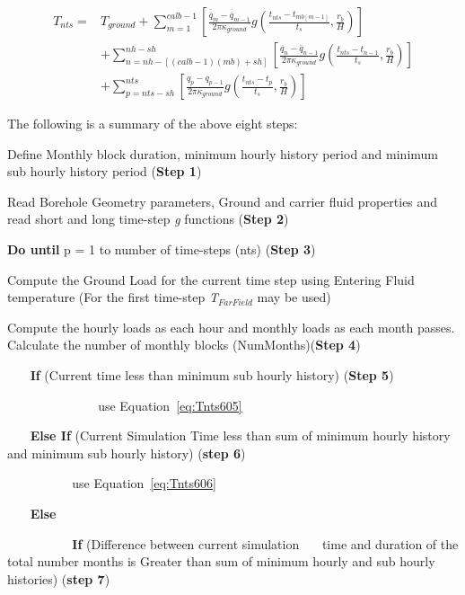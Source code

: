 \begin{equation}
\begin{array}{rl}
{T_{nts}} =& {T_{ground}} + \sum\limits_{m = 1}^{calb - 1} {\left[ {\frac{{{{\overline{\overline q} }_m} - {{\overline{\overline q} }_{m - 1}}}}{{2\pi {\kappa_{ground}}}}g\left( {\frac{{{t_{nts}} - {t_{mb[m - 1]}}}}{{{t_s}}},\frac{{{r_b}}}{H}} \right)} \right]} \\
 & + \sum\limits_{n = nh - [(calb - 1)(mb) + sh]}^{nh - sh} {\left[ {\frac{{{{\overline q }_n} - {{\overline q }_{n - 1}}}}{{2\pi {\kappa_{ground}}}}g\left( {\frac{{{t_{nts}} - {t_{n - 1}}}}{{{t_s}}},\frac{{{r_b}}}{H}} \right)} \right]} \\
 & + \sum\limits_{p = nts - sh}^{nts} {\left[ {\frac{{{q_p} - {q_{p - 1}}}}{{2\pi {\kappa_{ground}}}}g\left( {\frac{{{t_{nts}} - {t_p}}}{{{t_s}}},\frac{{{r_b}}}{H}} \right)} \right]}
\end{array}
\label{eq:Tnts608}
\end{equation}

The following is a summary of the above eight steps:

Define Monthly block duration, minimum hourly history period and minimum sub hourly history period (\textbf{Step 1})

Read Borehole Geometry parameters, Ground and carrier fluid properties and read short and long time-step \emph{g} functions (\textbf{Step 2})

\textbf{Do until} p = 1 to number of time-steps (nts) (\textbf{Step 3})

Compute the Ground Load for the current time step using Entering Fluid temperature (For the first time-step \emph{T}\(_{FarField}\) may be used)

Compute the hourly loads as each hour and monthly loads as each month passes. Calculate the number of monthly blocks (NumMonths)(\textbf{Step 4})

~~~ \textbf{If} (Current time less than minimum sub hourly history) (\textbf{Step 5})

~~~ ~~~~~~ \textbf{~~~} use Equation~\ref{eq:Tnts605}

~~~ \textbf{Else If} (Current Simulation Time less than sum of minimum hourly history and minimum sub hourly history) (\textbf{step 6})

~~~ ~~~~~~ use Equation~\ref{eq:Tnts606}

~~~ \textbf{Else}

~~~ ~~~~~~ \textbf{If} (Difference between current simulation~~~ time and duration of the total number months is Greater than sum of minimum hourly and sub hourly histories) (\textbf{step 7})

